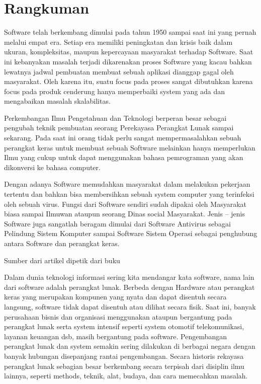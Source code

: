 \section{Rangkuman}
\begin{flushleft}
Software telah berkembang dimulai pada tahun 1950 sampai saat ini yang pernah melalui empat  era. Setiap era memiliki peningkatan dan krisis baik dalam ukuran, kompleksitas, maupun kepercayaan masyarakat terhadap Software. Saat ini kebanyakan masalah terjadi dikarenakan proses Software yang kacau bahkan lewatnya jadwal pembuatan membuat sebuah aplikasi dianggap gagal oleh masyarakat. Oleh karena itu, suatu focus pada proses sangat dibutuhkan karena focus pada produk cenderung hanya memperbaiki system yang ada dan mengabaikan masalah skalabilitas.
\end{flushleft}
\begin{flushleft}
Perkembangan Ilmu Pengetahuan dan Teknologi berperan besar sebagai pengubah teknik pembuatan seorang Perekayasa Perangkat Lunak sampai sekarang. Pada saat ini orang tidak perlu  sangat mempermasalahkan sebuah perangkat keras untuk membuat sebuah Software melainkan hanya memperlukan Ilmu yang cukup untuk dapat menggunakan bahasa pemrograman yang akan dikonversi ke bahasa computer. 
\end{flushleft}
\begin{flushleft}
Dengan adanya Software memudahkan masyarakat dalam melakukan pekerjaan tertentu dan bahkan bisa membersihkan sebuah system computer yang terinfeksi oleh sebuah virus. Fungsi dari Software sendiri sudah dipakai oleh Masyarakat biasa sampai Ilmuwan ataupun seorang Dinas social Masyarakat. Jenis – jenis Software juga sangatlah beragam dimulai dari Software Antivirus sebagai Pelindung Sistem Komputer sampai Software Sistem Operasi sebagai penghubung antara Software dan perangkat keras.
\end{flushleft}
Sumber dari artikel dipetik dari buku \cite{simarmata2010rekayasa}

Dalam dunia teknologi informasi sering kita mendangar kata software, nama lain dari software adalah perangkat lunak. Berbeda dengan Hardware atau perangkat keras yang merupakan kompunen yang nyata dan dapat disentuh secara langsung, software tidak dapat disentuh atau dilihat secara fisik. Saat ini, banyak perusahaan bisnis dan organisasi menggunakan ataupun bergantung pada perangkat lunak serta system intensif seperti system otomotif telekomunikasi, layanan keuangan dsb, masih bergantung pada software.
	Pengembangan perangkat lunak dan system semakin sering dilakukan di berbagai negara dengan banyak hubungan disepanjang rantai pengembangan. Secara historis rekayasa perangkat lunak sebagian besar berkembang secara terpisah dari disiplin ilmu lainnya, seperti methods, teknik, alat, budaya, dan cara memecahkan masalah.
